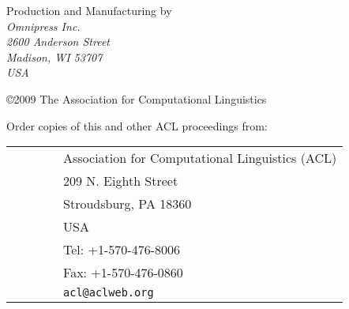 \documentclass[11pt]{article}
\begin{document}
\noindent Production and Manufacturing by \\
{\em Omnipress Inc.\\
2600 Anderson Street \\
Madison, WI 53707 \\
USA}

%
%

\vspace*{3.5in}
\large
\noindent
\copyright 2009 The Association for Computational Linguistics

\vspace*{0.6in}
\noindent Order copies of this and other ACL proceedings from: \\
\vspace*{3mm}

\begin{tabular}{ll}
\ \ \ \ \ \ & Association for Computational Linguistics (ACL) \\
& 209 N. Eighth Street \\
& Stroudsburg, PA 18360 \\
& USA \\
& Tel: +1-570-476-8006 \\
& Fax: +1-570-476-0860  \\
& {\tt acl@aclweb.org} \\
\end{tabular}
\end{document}
